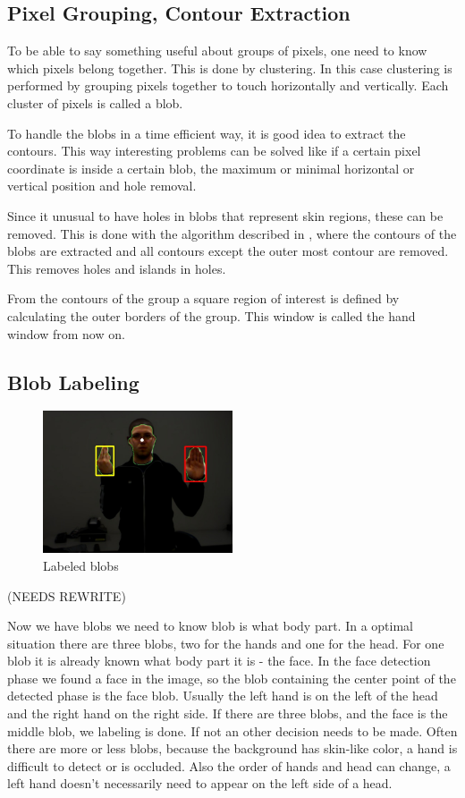 \subsection*{Pixel Grouping, Contour Extraction}
To be able to say something useful about groups of pixels, one need to know which pixels belong together. This is done by clustering. In this case clustering is performed by grouping pixels together to touch horizontally and vertically. Each cluster of pixels is called a blob.

To handle the blobs in a time efficient way, it is good idea to extract the contours. This way interesting problems can be solved like if a certain pixel coordinate is inside a certain blob, the maximum or minimal horizontal or vertical position and hole removal.

Since it unusual to have holes in blobs that represent skin regions, these can be removed. This is done with the algorithm described in \cite{Suzuki1985}, where the contours of the blobs are extracted and all contours except the outer most contour are removed. This removes holes and islands in holes.

From the contours of the group a square region of interest is defined by calculating the outer borders of the group. This window is called the hand window from now on.

\subsection*{Blob Labeling}

\begin{figure}[htbp]
    \center{}
    \includegraphics[width=0.5\textwidth]{figures/pipeline/contours.jpg}
	\caption{Labeled blobs}
	\label{fig:contours}
\end{figure}

(NEEDS REWRITE)

Now we have blobs we need to know blob is what body part. In a optimal situation there are three blobs, two for the hands and one for the head. For one blob it is already known what body part it is - the face. In the face detection phase we found a face in the image, so the blob containing the center point of the detected phase is the face blob. Usually the left hand is on the left of the head and the right hand on the right side. If there are three blobs, and the face is the middle blob, we labeling is done. If not an other decision needs to be made. Often there are more or less blobs, because the background has skin-like color, a hand is difficult to detect or is occluded. Also the order of hands and head can change, a left hand doesn't necessarily need to appear on the left side of a head.

